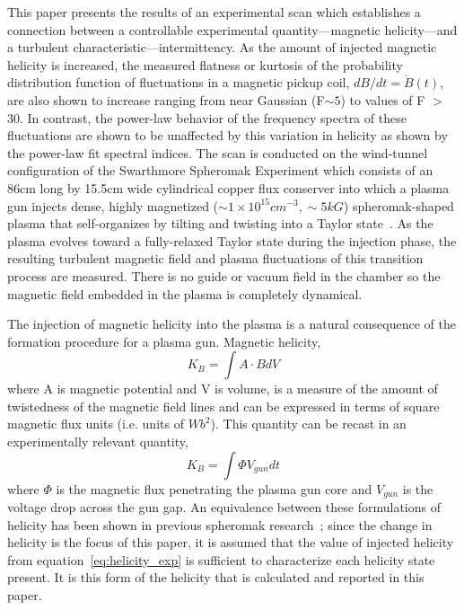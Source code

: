 \documentclass[aps,prl,amsmath,amssymb,reprint,superscriptaddress]{revtex4-1} %
\begin{document}
This paper presents the results of an experimental scan which establishes a connection between a controllable experimental quantity---magnetic helicity---and a turbulent characteristic---intermittency. As the amount of injected magnetic helicity is increased, the measured flatness or kurtosis of the probability distribution function of fluctuations in a magnetic pickup coil, $dB/dt = \dot{B}(t)$, are also shown to increase ranging from near Gaussian (F$\sim 5$) to values of F $>$ 30. In contrast, the power-law behavior of the frequency spectra of these fluctuations are shown to be unaffected by this variation in helicity as shown by the power-law fit spectral indices. The scan is conducted on the wind-tunnel configuration of the Swarthmore Spheromak Experiment which consists of an 86cm long by 15.5cm wide cylindrical copper flux conserver into which a plasma gun injects dense, highly magnetized ($\sim 1\times 10^{15} cm^{-3}, \sim 5kG$) spheromak-shaped plasma that self-organizes by tilting and twisting into a Taylor state~\cite{Gray13,Matthaeus80,Taylor86}. As the plasma evolves toward a fully-relaxed Taylor state during the injection phase, the resulting turbulent magnetic field and plasma fluctuations of this transition process are measured. There is no guide or vacuum field in the chamber so the magnetic field embedded in the plasma is completely dynamical. 

The injection of magnetic helicity into the plasma is a natural consequence of the formation procedure for a plasma gun. Magnetic helicity,
%
\begin{equation}
K_{B} = \int A \cdot B dV
\label{eq:helicity_th}
\end{equation}
%
where A is magnetic potential and V is volume, is a measure of the amount of twistedness of the magnetic field lines and can be expressed in terms of square magnetic flux units (i.e. units of $Wb^{2}$). This quantity can be recast in an experimentally relevant quantity, 
%
\begin{equation}
K_{B} = \int \Phi V_{gun} dt
\label{eq:helicity_exp}
\end{equation}
%
where $\Phi$ is the magnetic flux penetrating the plasma gun core and $V_{gun}$ is the voltage drop across the gun gap. An equivalence between these formulations of helicity has been shown in previous spheromak research~\cite{barnes86}; since the change in helicity is the focus of this paper, it is assumed that the value of injected helicity from equation~\ref{eq:helicity_exp} is sufficient to characterize each helicity state present. It is this form of the helicity that is calculated and reported in this paper.
\end{document}
